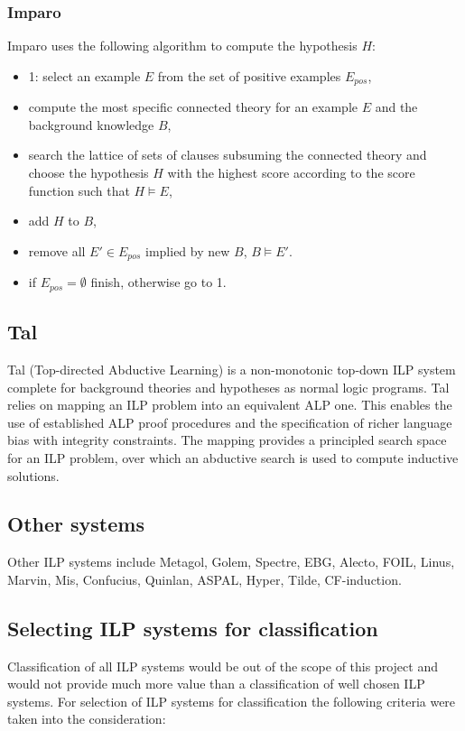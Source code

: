 \subsubsection{Imparo\cite{kimber2012learning}}
Imparo uses the following algorithm to compute the hypothesis $H$:
\begin{itemize}
\item 1: select an example $E$ from the set of positive examples $E_{pos}$,
\item compute the most specific connected theory for an example $E$ and the background knowledge $B$,
\item search the lattice of sets of clauses subsuming the connected theory and choose the hypothesis $H$ with the highest score according to the score function such that $H \models E$,
\item add $H$ to $B$,
\item remove all $E' \in E_{pos}$ implied by new $B$, $B \models E'$.
\item if $E_{pos} = \emptyset$ finish, otherwise go to 1.
\end{itemize}

\subsection{Tal\cite{corapi2010inductive}\cite{corapi2011tal}}
Tal (Top-directed Abductive Learning) is a non-monotonic top-down ILP system complete for background theories and hypotheses as normal logic programs. 
Tal relies on mapping an ILP problem into an equivalent ALP one. This enables the
use of established ALP proof procedures and the specification of richer language bias with integrity constraints. The mapping provides a principled search space for an ILP problem, over which an abductive search is used to compute inductive solutions.

\subsection{Other systems}
Other ILP systems include Metagol, Golem, Spectre, EBG, Alecto, FOIL, Linus, Marvin, Mis, Confucius, Quinlan, ASPAL, Hyper,  Tilde, CF-induction.

\subsection{Selecting ILP systems for classification}
Classification of all ILP systems would be out of the scope of this project and would not provide much more value than a classification of well chosen ILP systems.
For selection of ILP systems for classification the following criteria were taken into the consideration:


